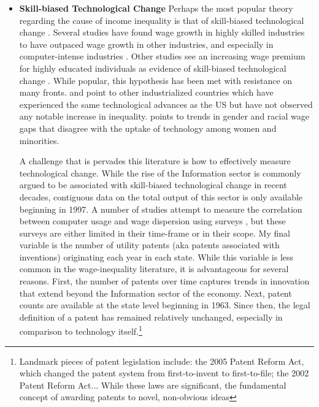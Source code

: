 \documentclass[11pt]{article}
\theoremstyle{definition}
\numberwithin{equation}{section}
\begin{document}
\begin{itemize}
	\item {\bf Skill-biased Technological Change} Perhaps the most popular theory regarding the cause of income inequality is that of skill-biased technological change \citep{krueger2012rise}. Several studies have found wage growth in highly skilled industries to have outpaced wage growth in other industries, and especially in computer-intense industries \citep{bound1992changes, david1998computing,galor2000ability,autor2008trends}. Other studies see an increasing wage premium for highly educated individuals as evidence of skill-biased technological change \citep{acemoglu1998new,heckman1998explaining}. While popular, this hypothesis has been met with resistance on many fronts. \cite{piketty2003income} and \cite{atkinson2011top} point to other industrialized countries which have experienced the same technological advances as the US but have not observed any notable increase in inequality. \cite{dinardo2002skill} points to trends in gender and racial wage gaps that disagree with the uptake of technology among women and minorities. 

	A challenge that is pervades this literature is how to effectively measure technological change.  While the rise of the Information sector is commonly argued to be associated with skill-biased technological change in recent decades, contiguous data on the total output of this sector is only available beginning in 1997. A number of studies attempt to measure the correlation between computer usage and wage dispersion using surveys \cite{david1998computing,dinardo2002skill}, but these surveys are either limited in their time-frame or in their scope. My final variable is the number of utility patents (aka patents associated with inventions) originating each year in each state. While this variable is less common in the wage-inequality literature, it is advantageous for several reasons. First, the number of patents over time captures trends in innovation that extend beyond the Information sector of the economy. Next, patent counts are available at the state level beginning in 1963. Since then, the legal definition of a patent has remained relatively unchanged, especially in comparison to technology itself.\footnote{Landmark pieces of patent legislation include: the 2005 Patent Reform Act, which changed the patent system from first-to-invent to first-to-file; the 2002 Patent Reform Act... While these laws are significant, the fundamental concept of awarding patents to novel, non-obvious ideas}



\end{itemize}
\end{document}
